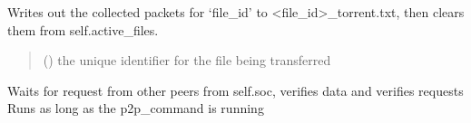 \documentclass[letterpaper,10pt,oneside,english,openany]{sphinxmanual}
\begin{document}
\begin{fulllineitems}

\begin{fulllineitems}
\label{\detokenize{modules:receiver_rdt.Receiver.finalize_file}}
\pysigstartsignatures
\pysiglinewithargsret
{}
{}
{}
\pysigstopsignatures
\sphinxAtStartPar
Writes out the collected packets for ‘file\_id’ to \textless{}file\_id\textgreater{}\_torrent.txt,
then clears them from self.active\_files.
\begin{quote}\begin{description}
\sphinxAtStartPar
{} () \textendash{} the unique identifier for the file being transferred

\end{description}\end{quote}

\end{fulllineitems}


\begin{fulllineitems}
\label{\detokenize{modules:receiver_rdt.Receiver.listen_for_requests}}
\pysigstartsignatures
\pysiglinewithargsret
{}
{}
{}
\pysigstopsignatures
\sphinxAtStartPar
Waits for request from other peers from self.soc, verifies data and verifies requests
Runs as long as the p2p\_command is running

\end{fulllineitems}


\begin{fulllineitems}
\label{\detokenize{modules:id1}}
\pysigstartsignatures
\pysigline
{}
\pysigstopsignatures
\end{fulllineitems}



\end{fulllineitems}
\end{document}
